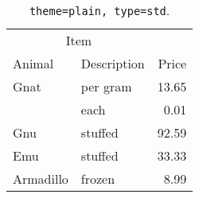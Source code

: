 \begin{table}[!htb]
\large
\centering
\begin{tabular}{llr}
\multicolumn{2}{c}{Item} &             \\
Animal                   & Description & Price \\
Gnat      & per gram & 13.65 \\
          & each     & 0.01  \\
Gnu       & stuffed  & 92.59 \\
Emu       & stuffed  & 33.33 \\
Armadillo & frozen   & 8.99  \\
\end{tabular}
\caption[\texttt{theme=plain, type=std}]{\texttt{theme=plain, type=std}. }
\end{table}
